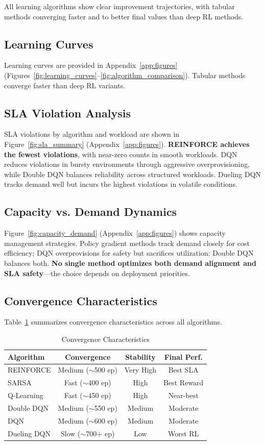 \documentclass[conference]{IEEEtran}
\begin{document}
All learning algorithms show clear improvement trajectories, with tabular methods converging faster and to better final values than deep RL methods.

\subsection{Learning Curves}
Learning curves are provided in Appendix~\ref{app:figures} (Figures~\ref{fig:learning_curves}--\ref{fig:algorithm_comparison}). Tabular methods converge faster than deep RL variants.

\subsection{SLA Violation Analysis}
SLA violations by algorithm and workload are shown in Figure~\ref{fig:sla_summary} (Appendix~\ref{app:figures}). \textbf{REINFORCE achieves the fewest violations}, with near-zero counts in smooth workloads. DQN reduces violations in bursty environments through aggressive overprovisioning, while Double DQN balances reliability across structured workloads. Dueling DQN tracks demand well but incurs the highest violations in volatile conditions.

\subsection{Capacity vs. Demand Dynamics}
Figure~\ref{fig:capacity_demand} (Appendix~\ref{app:figures}) shows capacity management strategies. Policy gradient methods track demand closely for cost efficiency; DQN overprovisions for safety but sacrifices utilization; Double DQN balances both. \textbf{No single method optimizes both demand alignment and SLA safety}---the choice depends on deployment priorities.

\subsection{Convergence Characteristics}
Table~\ref{tab:convergence} summarizes convergence characteristics across all algorithms.

\begin{table}[htbp]
\centering
\caption{Convergence Characteristics}
\label{tab:convergence}
\begin{tabular}{lccc}
\toprule
\textbf{Algorithm} & \textbf{Convergence} & \textbf{Stability} & \textbf{Final Perf.} \\
\midrule
\rowcolor{purple!10} REINFORCE & Medium ($\sim$500 ep) & Very High & Best SLA \\
SARSA & Fast ($\sim$400 ep) & High & Best Reward \\
Q-Learning & Fast ($\sim$450 ep) & High & Near-best \\
Double DQN & Medium ($\sim$550 ep) & Medium & Moderate \\
DQN & Medium ($\sim$600 ep) & Medium & Moderate \\
Dueling DQN & Slow ($\sim$700+ ep) & Low & Worst RL \\
\bottomrule
\end{tabular}
\end{table}
\end{document}
